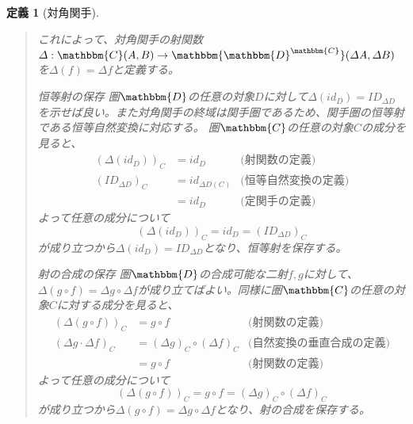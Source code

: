 \documentclass[uplatex,dvipdfmx]{jsarticle}
\newcommand{\cat}[1]{\mathbbm{#1}}
\newcommand{\arrow}{\rightarrow}
\newcommand{\mor}[3]{#1:#2\arrow #3}
\newcommand{\arset}[3]{\cat{#1}(#2,#3)}
\newcommand{\funccat}[2]{\cat{#2}^\cat{#1}}
\newtheorem{define}[proof]{定義}
\numberwithin{proof}{subsection}
\newenvironment{mydescription}
{\begin{description}
  \setlength{\parskip}{0.5cm}
}
{\end{description}}
\begin{document}
\begin{define}[対角関手]
\begin{quote}
\begin{mydescription}
\begin{center}
        \end{center}

        これによって、対角関手の射関数$\mor{\varDelta}{\arset{C}{A}{B}}{\arset{\funccat{C}{D}}{\varDelta A}{\varDelta B}}$を$\varDelta(f)=\varDelta f$と定義する。

				\item[恒等射の保存] 圏$\cat{D}$の任意の対象$D$に対して$\varDelta(id_D)=ID_{\varDelta D}$を示せば良い。また対角関手の終域は関手圏であるため、関手圏の恒等射である恒等自然変換に対応する。
        圏$\cat{C}$の任意の対象$C$の成分を見ると、
        \begin{align*}
          (\varDelta (id_D))_C &= id_D &\text{(射関数の定義)}\\
          (ID_{\varDelta D})_C &= id_{\varDelta D(C)}&\text{(恒等自然変換の定義)}\\
          &= id_D&\text{(定関手の定義)}
        \end{align*}
        よって任意の成分について\[(\varDelta (id_D))_C=id_D=(ID_{\varDelta D})_C\]が成り立つから$\varDelta(id_D)=ID_{\varDelta D}$となり、恒等射を保存する。

				\item[射の合成の保存] 圏$\cat{D}$の合成可能な二射$f,g$に対して、$\varDelta(g\circ f)=\varDelta g\circ \varDelta f$が成り立てばよい。同様に圏$\cat{C}$の任意の対象$C$に対する成分を見ると、
        \begin{align*}
          (\varDelta(g\circ f))_C&=g\circ f&\text{(射関数の定義)}\\
          (\varDelta g\cdot\varDelta f)_C &= (\varDelta g)_C\circ (\varDelta f)_C&\text{(自然変換の垂直合成の定義)}\\
          &=g\circ f&\text{(射関数の定義)}
        \end{align*}
        よって任意の成分について\[(\varDelta(g\circ f))_C=g\circ f=(\varDelta g)_C\circ (\varDelta f)_C\]が成り立つから$\varDelta(g\circ f)=\varDelta g\circ \varDelta f$となり、射の合成を保存する。
			\end{mydescription}
		\end{quote}
  \end{define}
\end{document}
